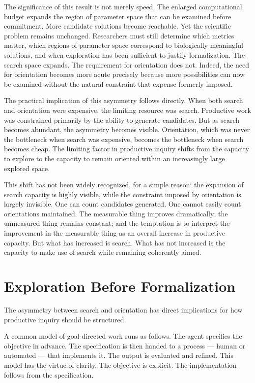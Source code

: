 The significance of this result is not merely speed. The enlarged computational
budget expands the region of parameter space that can be examined before
commitment. More candidate solutions become reachable. Yet the scientific
problem remains unchanged. Researchers must still determine which metrics
matter, which regions of parameter space correspond to biologically meaningful
solutions, and when exploration has been sufficient to justify formalization.
The search space expands. The requirement for orientation does not. Indeed,
the need for orientation becomes more acute precisely because more possibilities
can now be examined without the natural constraint that expense formerly imposed.

The practical implication of this asymmetry follows directly. When both search
and orientation were expensive, the limiting resource was search. Productive
work was constrained primarily by the ability to generate candidates. But as
search becomes abundant, the asymmetry becomes visible. Orientation, which was
never the bottleneck when search was expensive, becomes the bottleneck when
search becomes cheap. The limiting factor in productive inquiry shifts from
the capacity to explore to the capacity to remain oriented within an increasingly
large explored space.

This shift has not been widely recognized, for a simple reason: the expansion
of search capacity is highly visible, while the constraint imposed by orientation
is largely invisible. One can count candidates generated. One cannot easily count
orientations maintained. The measurable thing improves dramatically; the
unmeasured thing remains constant; and the temptation is to interpret the
improvement in the measurable thing as an overall increase in productive capacity.
But what has increased is search. What has not increased is the capacity to
make use of search while remaining coherently aimed.

\section{Exploration Before Formalization}

The asymmetry between search and orientation has direct implications for how
productive inquiry should be structured.

A common model of goal-directed work runs as follows. The agent specifies the
objective in advance. The specification is then handed to a process --- human
or automated --- that implements it. The output is evaluated and refined.
This model has the virtue of clarity. The objective is explicit. The
implementation follows from the specification.


